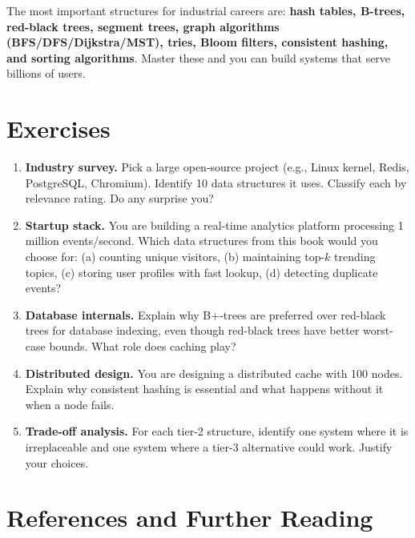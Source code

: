 The most important structures for industrial careers are: \textbf{hash tables, B-trees, red-black trees, segment trees, graph algorithms (BFS/DFS/Dijkstra/MST), tries, Bloom filters, consistent hashing, and sorting algorithms}. Master these and you can build systems that serve billions of users.

\section{Exercises}

\begin{enumerate}
\item \textbf{Industry survey.} Pick a large open-source project (e.g., Linux kernel, Redis, PostgreSQL, Chromium). Identify 10 data structures it uses. Classify each by relevance rating. Do any surprise you?

\item \textbf{Startup stack.} You are building a real-time analytics platform processing 1 million events/second. Which data structures from this book would you choose for: (a) counting unique visitors, (b) maintaining top-$k$ trending topics, (c) storing user profiles with fast lookup, (d) detecting duplicate events?

\item \textbf{Database internals.} Explain why B+-trees are preferred over red-black trees for database indexing, even though red-black trees have better worst-case bounds. What role does caching play?

\item \textbf{Distributed design.} You are designing a distributed cache with 100 nodes. Explain why consistent hashing is essential and what happens without it when a node fails.

\item \textbf{Trade-off analysis.} For each tier-2 structure, identify one system where it is irreplaceable and one system where a tier-3 alternative could work. Justify your choices.
\end{enumerate}

\section{References and Further Reading}
\label{sec:industrial-references}

